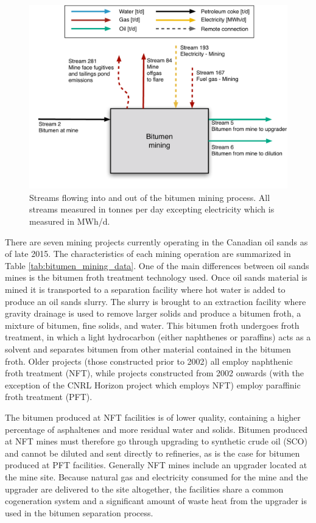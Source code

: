 \documentclass[11pt]{report}
\begin{document}
\begin{figure}
\includegraphics[width=0.85\columnwidth]{images/Bitumen_Mining_PF.pdf}
\caption{Streams flowing into and out of the bitumen mining process. All streams measured in tonnes per day excepting electricity which is measured in MWh/d.}
\label{fig:mining_PF}
\end{figure}

\clearpage


There are seven mining projects currently operating in the Canadian oil sands as of late 2015. The characteristics of each mining operation are summarized in Table \ref{tab:bitumen_mining_data}. One of the main differences between oil sands mines is the bitumen froth treatment technology used. Once oil sands material is mined it is transported to a separation facility where hot water is added to produce an oil sands slurry. The slurry is brought to an extraction facility where gravity drainage is used to remove larger solids and produce a bitumen froth, a mixture of bitumen, fine solids, and water. This bitumen froth undergoes froth treatment, in which a light hydrocarbon (either naphthenes or paraffins) acts as a solvent and separates bitumen from other material contained in the bitumen froth.  Older projects (those constructed prior to 2002) all employ naphthenic froth treatment (NFT), while projects constructed from 2002 onwards (with the exception of the CNRL Horizon project which employs NFT) employ paraffinic froth treatment (PFT).  

The bitumen produced at NFT facilities is of lower quality, containing a higher percentage of asphaltenes and more residual water and solids. Bitumen produced at NFT mines must therefore go through upgrading to synthetic crude oil (SCO) and cannot be diluted and sent directly to refineries, as is the case for bitumen produced at PFT facilities. Generally NFT mines include an upgrader located at the mine site. Because natural gas and electricity consumed for the mine and the upgrader are delivered to the site altogether, the facilities share a common cogeneration system and a significant amount of waste heat from the upgrader is used in the bitumen separation process. 
\end{document}
